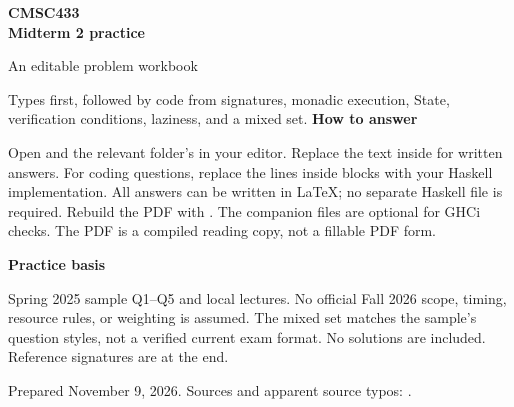 \documentclass[11pt,letterpaper,oneside]{report}
\newcommand{\answer}[1]{\par\nopagebreak[4]\smallskip\noindent\textbf{Answer: }#1\par\medskip}
\begin{document}
\hypersetup{pageanchor=false}
\begin{titlepage}
\vspace*{0.6in}
{\Huge\bfseries CMSC433\\[0.2em]Midterm 2 practice}\par
\vspace{0.35in}
{\LARGE An editable problem workbook}\par
\vspace{0.2in}
Types first, followed by code from signatures, monadic execution, State,
verification conditions, laziness, and a mixed set.
\vfill
\textbf{How to answer}\par
Open  and the relevant folder's  in your
editor. Replace the text inside \code{\answer{...}} for written answers.
For coding questions, replace the  lines inside
 blocks with your Haskell implementation. All answers can be
written in LaTeX; no separate Haskell file is required. Rebuild the PDF with
. The companion  files are optional for GHCi
checks. The PDF is a compiled reading copy, not a fillable PDF form.
\par\medskip
\textbf{Practice basis}\par
Spring 2025 sample Q1--Q5 and local lectures. No official Fall 2026 scope,
timing, resource rules, or weighting is assumed. The mixed set matches the
sample's question styles, not a verified current exam format. No solutions are
included. Reference signatures are at the end.
\par\medskip
Prepared November 9, 2026. Sources and apparent source typos: .
\end{titlepage}
\hypersetup{pageanchor=true}
\tableofcontents
\clearpage
{}









\appendix

\end{document}
